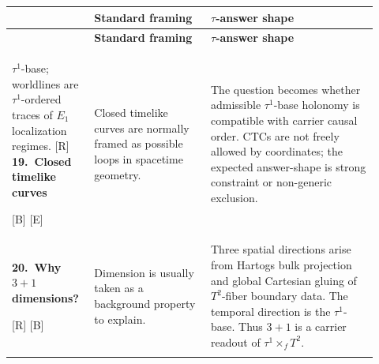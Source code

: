 \documentclass{pantarhei-researchnote}
\makeatletter
\newcommand{\Rtag}{\textcolor{pr-lane-verify}{\textsc{[R]}}}
\newcommand{\Btag}{\textcolor{pr-lane-results}{\textsc{[B]}}}
\newcommand{\Etag}{\textcolor{pr-lane-publications}{\textsc{[E]}}}
\newcommand{\ledgerrow}[5]{%
  \textbf{#1.\ #2}\par{\scriptsize\sffamily #5} &
  #3 &
  #4 \\
  \addlinespace[0.35em]
}
\newenvironment{clusterledger}{%
  \renewcommand{\arraystretch}{1.18}%
  \footnotesize
  \begin{longtable}{@{}>{\RaggedRight\arraybackslash}p{0.19\linewidth}%
    >{\RaggedRight\arraybackslash}p{0.30\linewidth}%
    >{\RaggedRight\arraybackslash}p{0.43\linewidth}@{}}
  \toprule
  {\sffamily\bfseries\color{pr-brand-700}Question} &
  {\sffamily\bfseries\color{pr-brand-700}Standard framing} &
  {\sffamily\bfseries\color{pr-brand-700}\(\tau\)-answer shape} \\
  \midrule
  \endfirsthead
  \toprule
  {\sffamily\bfseries\color{pr-brand-700}Question} &
  {\sffamily\bfseries\color{pr-brand-700}Standard framing} &
  {\sffamily\bfseries\color{pr-brand-700}\(\tau\)-answer shape} \\
  \midrule
  \endhead
}{%
  \bottomrule
  \end{longtable}
  \normalsize
}
\makeatother
\begin{document}
\begin{clusterledger}
{\(\tau^1\)-base; worldlines are \(\tau^1\)-ordered traces of \(E_1\)
localization regimes.}
{\Rtag}
\ledgerrow{19}{Closed timelike curves}
{Closed timelike curves are normally framed as possible loops in spacetime
geometry.}
{The question becomes whether admissible \(\tau^1\)-base holonomy is
compatible with carrier causal order. CTCs are not freely allowed by
coordinates; the expected answer-shape is strong constraint or non-generic
exclusion.}
{\Btag{} \Etag}
\ledgerrow{20}{Why \(3+1\) dimensions?}
{Dimension is usually taken as a background property to explain.}
{Three spatial directions arise from Hartogs bulk projection and global
Cartesian gluing of \(T^2\)-fiber boundary data. The temporal direction is
the \(\tau^1\)-base. Thus \(3+1\) is a carrier readout of
\(\tau^1\times_f T^2\).}
{\Rtag{} \Btag}
\end{clusterledger}

\end{document}
